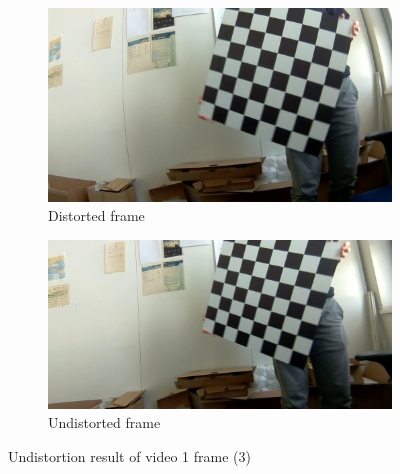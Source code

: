 \begin{figure}[h]
    \centering
    \begin{subfigure}[b]{0.48\textwidth}
        \centering
        \includegraphics[width=\textwidth]{figures/addl/img5_0.jpg}
        \caption{Distorted frame}
    \end{subfigure}
    \hfill
    \begin{subfigure}[b]{0.48\textwidth}
        \centering
        \includegraphics[width=\textwidth]{figures/addl/img5_5.jpg}
        \caption{Undistorted frame}
    \end{subfigure}
    \caption{Undistortion result of video 1 frame (3)}
    \label{fig:dist_1a3}
\end{figure}

